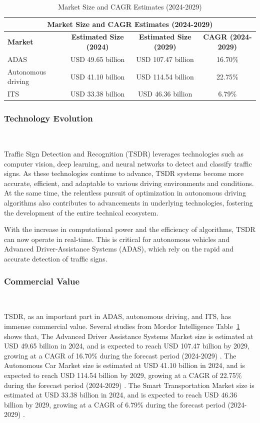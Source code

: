 \documentclass[letterpaper, 10 pt, conference]{ieeeconf}
\begin{document}
\begin{table}[t!]
    \centering
    \caption{Market Size and CAGR Estimates (2024-2029)}\label{tab:market_table}
    \begin{tabular}{@{}lccc@{}}
    \toprule
    \multicolumn{4}{c}{\textbf{Market Size and CAGR Estimates (2024-2029)}} \\
    \midrule
    \textbf{Market} & \textbf{Estimated Size (2024)} & \textbf{Estimated Size (2029)} & \textbf{CAGR (2024-2029)} \\
    \midrule
    ADAS               & USD 49.65 billion  & USD 107.47 billion  & 16.70\% \\
    Autonomous driving & USD 41.10 billion  & USD 114.54 billion  & 22.75\% \\
    ITS                & USD 33.38 billion  & USD 46.36 billion   & 6.79\%  \\
    \bottomrule
    \end{tabular}
\end{table}

\subsubsection{Technology Evolution}\

Traffic Sign Detection and Recognition (TSDR) leverages technologies such as computer vision, deep learning, and neural networks to detect and classify traffic signs. As these technologies continue to advance, TSDR systems become more accurate, efficient, and adaptable to various driving environments and conditions. At the same time, the relentless pursuit of optimization in autonomous driving algorithms also contributes to advancements in underlying technologies, fostering the development of the entire technical ecosystem.

With the increase in computational power and the efficiency of algorithms, TSDR can now operate in real-time. This is critical for autonomous vehicles and Advanced Driver-Assistance Systems (ADAS), which rely on the rapid and accurate detection of traffic signs. 

\subsubsection{Commercial Value}\

TSDR, as an important part in ADAS, autonomous driving, and ITS, has immense commercial value. Several studies from Mordor Intelligence Table~\ref{tab:market_table} shows that, The Advanced Driver Assistance Systems Market size is estimated at USD 49.65 billion in 2024, and is expected to reach USD 107.47 billion by 2029, growing at a CAGR of 16.70\% during the forecast period (2024-2029) \cite{Mordor2024ADAS}. The Autonomous Car Market size is estimated at USD 41.10 billion in 2024, and is expected to reach USD 114.54 billion by 2029, growing at a CAGR of 22.75\% during the forecast period (2024-2029) \cite{Mordor2023Autonomous}. The Smart Transportation Market size is estimated at USD 33.38 billion in 2024, and is expected to reach USD 46.36 billion by 2029, growing at a CAGR of 6.79\% during the forecast period (2024-2029) \cite{Mordor2024SmartTransportation}.
\end{document}
